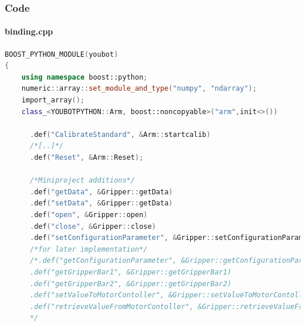 \documentclass{beamer}
\begin{document}
\begin{frame}[fragile]
 \frametitle{Code}
 \framesubtitle{binding.cpp}
\begin{lstlisting}[language=C++]
BOOST_PYTHON_MODULE(youbot)
{
    using namespace boost::python;
    numeric::array::set_module_and_type("numpy", "ndarray"); 
    import_array();
    class_<YOUBOTPYTHON::Arm, boost::noncopyable>("arm",init<>())

      .def("CalibrateStandard", &Arm::startcalib)
      /*[..]*/
      .def("Reset", &Arm::Reset);

      /*Miniproject additions*/
      .def("getData", &Gripper::getData)
      .def("setData", &Gripper::getData)
      .def("open", &Gripper::open)
      .def("close", &Gripper::close)
      .def("setConfigurationParameter", &Gripper::setConfigurationParameter)
      /*for later implementation*/
      /*.def("getConfigurationParameter", &Gripper::getConfigurationParameter)
      .def("getGripperBar1", &Gripper::getGripperBar1)
      .def("getGripperBar2", &Gripper::getGripperBar2)
      .def("setValueToMotorContoller", &Gripper::setValueToMotorContoller)
      .def("retrieveValueFromMotorContoller", &Gripper::retrieveValueFromMotorContoller)
      */
\end{lstlisting} 
\end{frame}


%         


\end{document}
